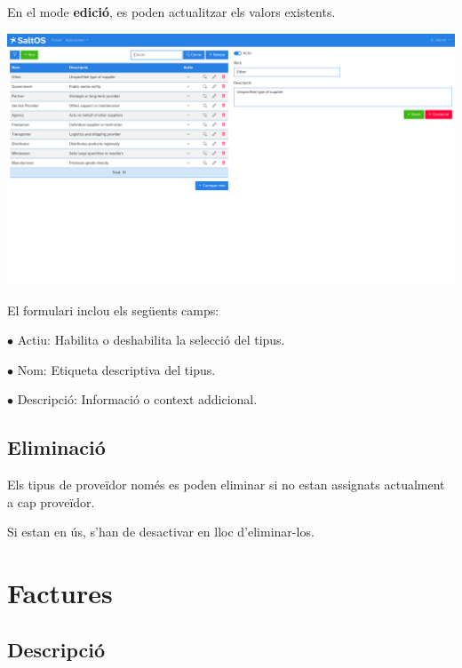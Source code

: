 \documentclass[a4paper]{article}
\begin{document}
En el mode \textbf{edició}, es poden actualitzar els valors existents.

\begin{center}\includegraphics[width=1\textwidth]{../ujest/snaps/test-screenshots-js-screenshots-purchases-suppliers-types-edit-10-ca-es-1-snap.png}\end{center}

El formulari inclou els següents camps:

\begin{compactitem}
\item[\color{myblue}$\bullet$] Actiu: Habilita o deshabilita la selecció del tipus.
\item[\color{myblue}$\bullet$] Nom: Etiqueta descriptiva del tipus.
\item[\color{myblue}$\bullet$] Descripció: Informació o context addicional.
\end{compactitem}

\hypertarget{toc135}{}
\subsection{Eliminació}

Els tipus de proveïdor només es poden eliminar si no estan assignats actualment a cap proveïdor.

Si estan en ús, s'han de desactivar en lloc d'eliminar-los.


\hypertarget{toc136}{}
\section{Factures}

\hypertarget{toc137}{}
\subsection{Descripció}
\end{document}
